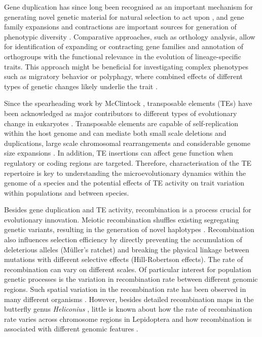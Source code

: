 \documentclass[twocolumn]{bmcart}%
\begin{document}
Gene duplication has since long been recognised as an important mechanism for generating novel genetic material for natural selection to act upon \cite{henikoffGeneFamiliesTaxonomy1997, ojeda-lopezEvolutionaryAnalysisMoringa2020, zhangDoesRecombinationShape2003}, and gene family expansions and contractions are important sources for generation of phenotypic diversity \cite{chenNewGenesDrivers2013a, kondrashovGeneDuplicationMechanism2012}. Comparative approaches, such as orthology analysis, allow for identification of expanding or contracting gene families and annotation of orthogroups with the functional relevance in the evolution of lineage-specific traits. This approach might be beneficial for investigating complex phenotypes such as migratory behavior or polyphagy, where combined effects of different types of genetic changes likely underlie the trait \cite{schwanderSupergenesComplexPhenotypes2014}. 

Since the spearheading work by McClintock \cite{mcclintockControllingElementsGene1956}, transposable elements (TEs) have been acknowledged as major contributors to different types of evolutionary change in eukaryotes \cite{kazazianMobileElementsDrivers2004, kidwellTransposableElementsSources1997}. Transposable elements are capable of self-replication within the host genome and can mediate both small scale deletions and duplications, large scale chromosomal rearrangements \cite{kidwellTransposableElementsSources1997} and considerable genome size expansions \cite{podsiadlowskiGenomeAssemblyAnnotation2021, tallaRapidIncreaseGenome2017}. In addition, TE insertions can affect gene function when regulatory or coding regions are targeted. Therefore, characterisation of the TE repertoire is key to understanding the microevolutionary dynamics within the genome of a species and the potential effects of TE activity on trait variation within populations and between species.

Besides gene duplication and TE activity, recombination is a process crucial for evolutionary innovation. Meiotic recombination shuffles existing segregating genetic variants, resulting in the generation of novel haplotypes \citep{penalbaMoleculesPopulationsAppreciating2020}. Recombination also influences selection efficiency by directly preventing the accumulation of deleterious alleles (Müller's ratchet) and breaking the physical linkage between mutations with different selective effects (Hill-Robertson effects). The rate of recombination can vary on different scales. Of particular interest for population genetic processes is the variation in recombination rate between different genomic regions. Such spatial variation in the recombination rate has been observed in many different organisms \citep{stapleyVariationRecombinationFrequency2017, tileyRelationshipRecombinationRate2015}. However, besides detailed recombination maps in the butterfly genus \textit{Heliconius} \citep{martinRecombinationRateVariation2019}, little is known about how the rate of recombination rate varies across chromosome regions in Lepidoptera and how recombination is associated with different genomic features \citep{haenelMetaanalysisChromosomescaleCrossover2018, tallaDissectingEffectsSelection2019}.
\end{document}
